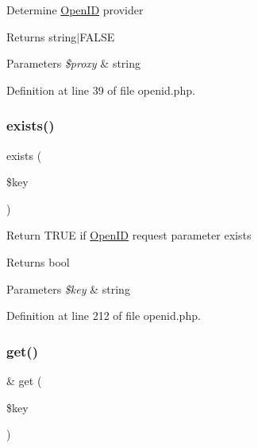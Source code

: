 Determine \hyperlink{class_web_1_1_open_i_d}{Open\+ID} provider \begin{DoxyReturn}{Returns}
string$\vert$\+F\+A\+L\+SE 
\end{DoxyReturn}

\begin{DoxyParams}{Parameters}
{\em \$proxy} & string \\
\hline
\end{DoxyParams}


Definition at line 39 of file openid.\+php.

\hypertarget{class_web_1_1_open_i_d_ace1ae5be37bf26c172cc7ea4e1a65e26}{}\label{class_web_1_1_open_i_d_ace1ae5be37bf26c172cc7ea4e1a65e26} 
\subsubsection{\texorpdfstring{exists()}{exists()}}
{\footnotesize\ttfamily exists (\begin{DoxyParamCaption}\item[{}]{\$key }\end{DoxyParamCaption})}

Return T\+R\+UE if \hyperlink{class_web_1_1_open_i_d}{Open\+ID} request parameter exists \begin{DoxyReturn}{Returns}
bool 
\end{DoxyReturn}

\begin{DoxyParams}{Parameters}
{\em \$key} & string \\
\hline
\end{DoxyParams}


Definition at line 212 of file openid.\+php.

\hypertarget{class_web_1_1_open_i_d_ac3695923790b06917410e205068b8376}{}\label{class_web_1_1_open_i_d_ac3695923790b06917410e205068b8376} 
\subsubsection{\texorpdfstring{get()}{get()}}
{\footnotesize\ttfamily \& get (\begin{DoxyParamCaption}\item[{}]{\$key }\end{DoxyParamCaption})}

